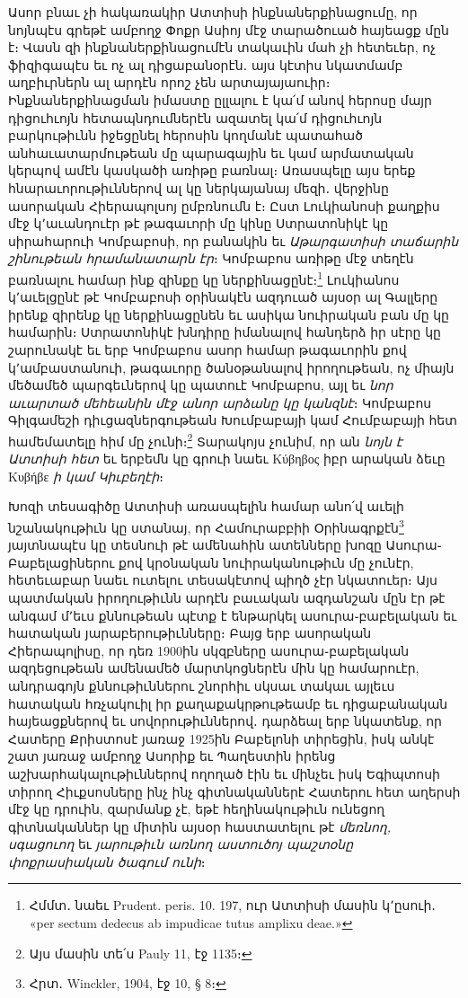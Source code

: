 \documentclass{article}
\begin{document}
{Ասոր բնաւ չի հակառակիր Ատտիսի ինքնաներքինացումը, որ նոյնպէս գրեթէ ամբողջ Փոքր Ասիոյ մէջ տարածուած հայեացք մըն է։ Վասն զի ինքնաներքինացումէն տակաւին մահ չի հետեւեր, ոչ ֆիզիգապէս եւ ոչ ալ դիցաբանօրէն․ այս կէտիս նկատմամբ աղբիւրներն ալ արդէն որոշ չեն արտայայաուիր։ Ինքնաներքինացման իմաստը ըլլալու է կա՛մ անով հերոսը մայր դիցուհւոյն հետապնդումներէն ազատել կա՛մ դիցուհւոյն բարկութիւնն իջեցընել հերոսին կողմանէ պատահած անհաւատարմութեան մը պարագային եւ կամ արմատական կերպով ամէն կասկածի առիթը բառնալ։ Առասպելը այս երեք հնարաւորութիւններով ալ կը ներկայանայ մեզի․ վերջինը ասորական Հիերապոլսոյ ըմբռնումն է։ Ըստ Լուկիանոսի քաղքիս մէջ կ՚աւանդուէր թէ թագաւորի մը կինը Ստրատոնիկէ կը սիրահարուի Կոմբաբոսի, որ բանակին եւ \emph{Աթարգատիսի տաճարին շինութեան հրամանատարն էր}։ Կոմբաբոս առիթը մէջ տեղէն բառնալու համար ինք զինքը կը ներքինացընէ։\footnote{Հմմտ․ նաեւ Prudent. peris. 10. 197, ուր Ատտիսի մասին կ՚ըսուի․ «per sectum dedecus ab impudicae tutus amplixu deae.»} Լուկիանոս կ՚աւելցընէ թէ Կոմբաբոսի օրինակէն ազդուած այսօր ալ Գալլերը իրենք զիրենք կը ներքինացընեն եւ ասիկա նուիրական բան մը կը համարին։ Ստրատոնիկէ խնդիրը իմանալով հանդերձ իր սէրը կը շարունակէ եւ երբ Կոմբաբոս ասոր համար թագաւորին քով կ՚ամբաստանուի, թագաւորը ծանօթանալով իրողութեան, ոչ միայն մեծամեծ պարգեւներով կը պատուէ Կոմբաբոս, այլ եւ \emph{նոր աւարտած մեհեանին մէջ անոր արձանը կը կանզնէ}։ Կոմբաբոս Գիլգամեշի դիւցազներգութեան Խումբաբայի կամ Հումբաբայի հետ համեմատելը հիմ մը չունի։\footnote{Այս մասին տե՛ս Pauly 11, էջ 1135։} Տարակոյս չունիմ, որ ան \emph{նոյն է Ատտիսի հետ} եւ երբեմն կը գրուի նաեւ Κύβηβος իբր արական ձեւը Κυβήβε \emph{ի կամ Կիւբեղէի}։

Խոզի տեսագիծը Ատտիսի առասպելին համար անո՛վ աւելի նշանակութիւն կը ստանայ, որ Համուրաբբիի Օրինագրքէն\footnote{Հրտ․ Winckler, 1904, էջ 10, § 8։} յայտնապէս կը տեսնուի թէ ամենահին ատենները խոզը Ասուրա֊Բաբելացիներու քով կրօնական նուիրականութիւն մը չունէր, հետեւաբար նաեւ ուտելու տեսակէտով պիղծ չէր նկատուեր։ Այս պատմական իրողութիւնն արդէն բաւական ազդանշան մըն էր թէ անգամ մ՚եւս քննութեան պէտք է ենթարկել ասուրա֊բաբելական եւ հատական յարաբերութիւնները։ Բայց երբ ասորական Հիերապոլիսը, որ դեռ 1900ին սկզբները ասուրա֊բաբելական ազդեցութեան ամենամեծ մարտկոցներէն մին կը համարուէր, անդրագոյն քննութիւններու շնորհիւ սկսաւ տակաւ այլեւս հատական հռչակուիլ իր քաղաքակրթութեամբ եւ դիցաբանական հայեացքներով եւ սովորութիւններով․ դարձեալ երբ նկատենք, որ Հատերը Քրիստոսէ յառաջ 1925ին Բաբելոնի տիրեցին, իսկ անկէ շատ յառաջ ամբողջ Ասորիք եւ Պաղեստին իրենց աշխարհակալութիւններով ողողած էին եւ մինչեւ իսկ Եգիպտոսի տիրող Հիւքսոսները ինչ ինչ գիտնականներէ Հատերու հետ աղերսի մէջ կը դրուին, զարմանք չէ, եթէ հեղինակութիւն ունեցող գիտնականներ կը միտին այսօր հաստատելու թէ \emph{մեռնող, սգացուող} եւ \emph{յարութիւն առնող աստուծոյ պաշտօնը փոքրասիական ծագում ունի}։

}
\end{document}
